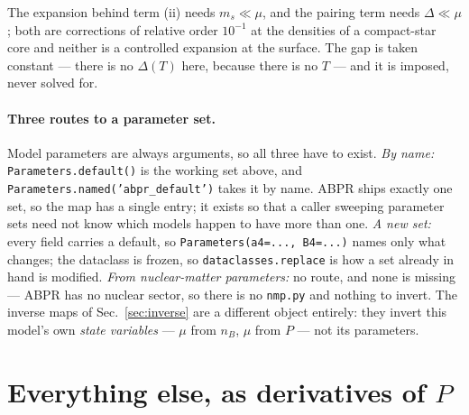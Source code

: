 \documentclass[aps,prc,onecolumn,superscriptaddress,nofootinbib,10pt]{revtex4-2}
\newcommand{\ms}{m_s}
\begin{document}
The expansion behind term (ii) needs $\ms \ll \mu$, and the pairing term needs
$\Delta \ll \mu$; both are corrections of relative order $10^{-1}$ at the
densities of a compact-star core and neither is a controlled expansion at the
surface. The gap is taken constant --- there is no $\Delta(T)$ here, because
there is no $T$ --- and it is imposed, never solved for.

\paragraph{Three routes to a parameter set.} Model parameters are always
arguments, so all three have to exist. \emph{By name:}
\texttt{Parameters.default()} is the working set above, and
\texttt{Parameters.named('abpr\_default')} takes it by name. ABPR ships exactly
one set, so the map has a single entry; it exists so that a caller sweeping
parameter sets need not know which models happen to have more than one.
\emph{A new set:} every field carries a default, so
\texttt{Parameters(a4=..., B4=...)} names only what changes; the dataclass is
frozen, so \texttt{dataclasses.replace} is how a set already in hand is
modified. \emph{From nuclear-matter parameters:} no route, and none is missing
--- ABPR has no nuclear sector, so there is no \texttt{nmp.py} and nothing to
invert. The inverse maps of Sec.~\ref{sec:inverse} are a different object
entirely: they invert this model's own \emph{state variables} --- $\mu$ from
$n_B$, $\mu$ from $P$ --- not its parameters.

\section{Everything else, as derivatives of $P$}
\label{sec:derived}
\end{document}
